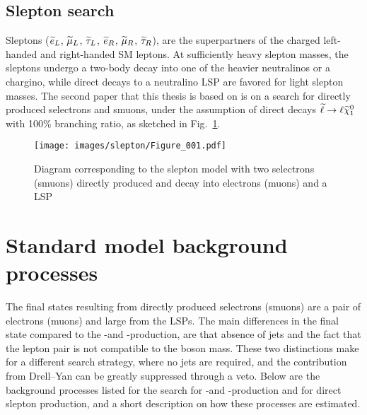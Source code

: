 \subsection*{Slepton search}\label{sec:searchSlepton}
\noindent
\justify
Sleptons ($\widetilde{e}_{L}$, $\widetilde{\mu}_{L}$, $\widetilde{\tau}_{L}$, $\widetilde{e}_{R}$, $\widetilde{\mu}_{R}$, $\widetilde{\tau}_{R}$), are the superpartners of the charged left-handed and right-handed SM leptons. 
At sufficiently heavy slepton masses, the sleptons undergo a two-body decay into one of the heavier neutralinos or a chargino, while direct decays to a neutralino LSP are favored for light slepton masses.
The second paper that this thesis is based on is on a search for directly produced selectrons and smuons, under the assumption of direct decays $\widetilde{\ell}\to \ell\widetilde{\chi}^{0}_{1}$ with 100\% branching ratio, as sketched in Fig.~\ref{fig:feynmanSlepton}.
\begin{figure}[!htp]
\centering
\texttt{[image: images/slepton/Figure\_001.pdf]}
\caption{Diagram corresponding to the slepton model with two selectrons (smuons) directly produced and decay into electrons (muons) and a LSP} 
\label{fig:feynmanSlepton}
\end{figure}                                                                                                                                           
\section{Standard model background processes}
The final states resulting from directly produced selectrons (smuons) are a pair of electrons (muons) and large \ptmiss from the LSPs. 
The main differences in the final state compared to the \firstcharg-\secondchi and \firstchi-\firstchi production, are that absence of jets and the fact that the lepton pair is not compatible to the \PZ boson mass. 
These two distinctions make for a different search strategy, where no jets are required, and the contribution from Drell--Yan can be greatly suppressed through a veto. 
Below are the background processes listed for the search for \firstcharg-\secondchi and \firstchi-\firstchi production and for direct slepton production, and a short description on how these processes are estimated. 
